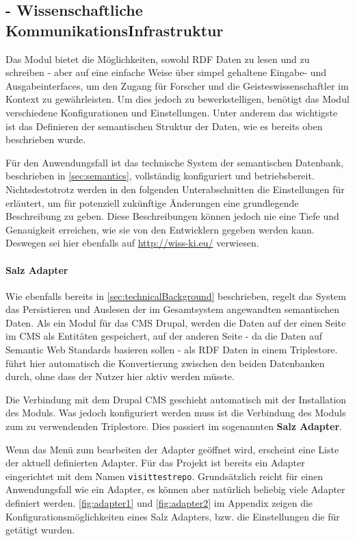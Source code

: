 \subsection{\wisski - Wissenschaftliche KommunikationsInfrastruktur}\label{sec:wisski}

Das \wisski Modul bietet die Möglichkeiten, sowohl RDF Daten zu lesen und zu schreiben - aber auf eine einfache Weise über simpel gehaltene Eingabe- und Ausgabeinterfaces, um den Zugang für Forscher und die Geisteswissenschaftler im \visit Kontext zu gewährleisten. Um dies jedoch zu bewerkstelligen, benötigt das Modul verschiedene Konfigurationen und Einstellungen. Unter anderem das wichtigste ist das Definieren der semantischen Struktur der Daten, wie es bereits oben beschrieben wurde.

Für den \visit Anwendungsfall ist das technische System der semantischen Datenbank, beschrieben in \autoref{sec:semantics}, vollständig konfiguriert und betriebsbereit. Nichtsdestotrotz werden in den folgenden Unterabschnitten die Einstellungen für \wisski erläutert, um für potenziell zukünftige Änderungen eine grundlegende Beschreibung zu geben. Diese Beschreibungen können jedoch nie eine Tiefe und Genauigkeit erreichen, wie sie von den \wisski Entwicklern gegeben werden kann. Deswegen sei hier ebenfalls auf \url{http://wiss-ki.eu/} verwiesen.

\paragraph{\wisski Salz Adapter}

Wie ebenfalls bereits in \autoref{sec:technicalBackground} beschrieben, regelt das \wisski System das Persistieren und Auslesen der im Gesamtsystem angewandten semantischen Daten. Als ein Modul für das CMS Drupal, werden die Daten auf der einen Seite im CMS als Entitäten gespeichert, auf der anderen Seite - da die Daten auf Semantic Web Standards basieren sollen - als RDF Daten in einem Triplestore. \wisski führt hier automatisch die Konvertierung zwischen den beiden Datenbanken durch, ohne dass der Nutzer hier aktiv werden müsste.

Die Verbindung mit dem Drupal CMS geschieht automatisch mit der Installation des \wisski Moduls. Was jedoch konfiguriert werden muss ist die Verbindung des Moduls zum zu verwendenden Triplestore. Dies passiert im sogenannten \textbf{\wisski Salz Adapter}.  

Wenn das Menü zum bearbeiten der Adapter geöffnet wird, erscheint eine Liste der aktuell definierten Adapter. Für das \visit Projekt ist bereits ein Adapter eingerichtet mit dem Namen \texttt{visittestrepo}. Grundsätzlich reicht für einen Anwendungsfall wie \visit ein Adapter, es können aber natürlich beliebig viele Adapter definiert werden. \autoref{fig:adapter1} und \autoref{fig:adapter2} im Appendix zeigen die Konfigurationsmöglichkeiten eines \wisski Salz Adapters, bzw. die Einstellungen die für \visit getätigt wurden.

